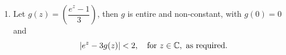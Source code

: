 \begin{enumerate}[label=(\alph*)]
\begin{enumerate}[label=(\roman*)]

        Let $f(z) = 3z + 3$, and $g(z) = z$. 
        \vspace{8pt}

        Then, \[
        \left| f(z) - 3g(z) \right| = \left| 3z + 3 - 3z \right| = \left| 3 \right| = 3 >2,\quad \text{for \ }z \in \mathbb{C}. 
        \]

        with both $f$ and $g$ being non-constant entire functions, as required.
        \vvs \\
        \item 
        Let $ g(z) = \left( \dfrac{e^z - 1}{3} \right) $, then $g$ is entire and non-constant, with $g(0) = 0$ and 
        \[ | e^z - 3g(z) | < 2, \quad \text{for } z \in \mathbb{C}, \text{ as required}. \]



    \end{enumerate}
\end{enumerate}

